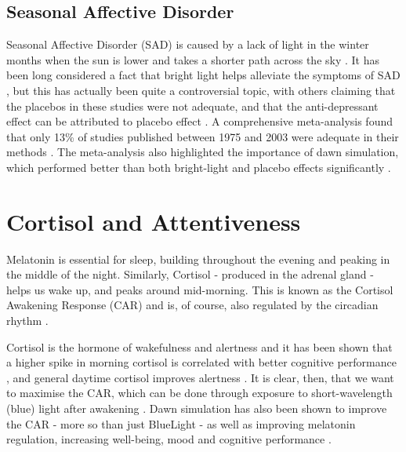 \subsection{Seasonal Affective Disorder}

Seasonal Affective Disorder (SAD) is caused by a lack of light in the winter months when the sun is lower and takes a shorter path across the sky \citep{eastmanNaturalSummerWinter1990}. It has been long considered a fact that bright light helps alleviate the symptoms of SAD \citep{magnussonTreatmentSeasonalAffective1991, leeSpectralPropertiesPhototherapy1997,eastmanBrightLightTreatment1998}, but this has actually been quite a controversial topic, with others claiming that the placebos in these studies were not adequate, and that the anti-depressant effect can be attributed to placebo effect \citep{eastman26ComparisonTwo1993}. A comprehensive meta-analysis found that only 13\% of studies published between 1975 and 2003 were adequate in their methods \citep{goldenEfficacyLightTherapy2005}. The meta-analysis also highlighted the importance of dawn simulation, which performed better than both bright-light and placebo effects significantly \citet{averyDawnSimulationBright2001}.


\section{Cortisol and Attentiveness}
\label{Sec:Cortisol}

Melatonin is essential for sleep, building throughout the evening and peaking in the middle of the night. Similarly, Cortisol - produced in the adrenal gland - helps us wake up, and peaks around mid-morning. This is known as the Cortisol Awakening Response (CAR) and is, of course, also regulated by the circadian rhythm \citep{friesCortisolAwakeningResponse2009}.

Cortisol is the hormone of wakefulness and alertness and it has been shown that a higher spike in morning cortisol is correlated with better cognitive performance \citep{evansDiurnalCortisolCycle2011}, and general daytime cortisol improves alertness \citep{chapototCortisolSecretionRelated1998}. It is clear, then, that we want to maximise the CAR, which can be done through exposure to short-wavelength (blue) light after awakening \citep{figueiroShortWavelengthLightEnhances2012}. Dawn simulation has also been shown to improve the CAR - more so than just \gls{BlueLight} - as well as improving melatonin regulation, increasing well-being, mood and cognitive performance \citep{gabelEffectsArtificialDawn2013}.

